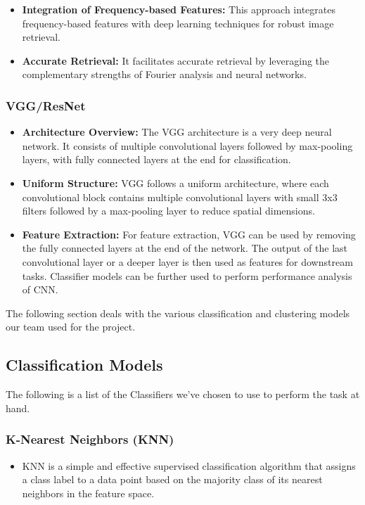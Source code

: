 \documentclass[a4paper]{article}
\theoremstyle{plain}
\theoremstyle{definition}
\begin{document}
{\begin{itemize}
    \item[] \textbf{Integration of Frequency-based Features:} This approach integrates frequency-based features with deep learning techniques for robust image retrieval.
    
    \item[] \textbf{Accurate Retrieval:} It facilitates accurate retrieval by leveraging the complementary strengths of Fourier analysis and neural networks.
\end{itemize}

\subsubsection {VGG/ResNet}
\begin{itemize}
     \item[] \textbf{Architecture Overview:} The VGG architecture is a very deep neural network. It consists of multiple convolutional layers followed by max-pooling layers, with fully connected layers at the end for classification.
    
    \item[] \textbf{Uniform Structure:} VGG follows a uniform architecture, where each convolutional block contains multiple convolutional layers with small 3x3 filters followed by a max-pooling layer to reduce spatial dimensions.
    
    \item[] \textbf{Feature Extraction:} For feature extraction, VGG can be used by removing the fully connected layers at the end of the network. The output of the last convolutional layer or a deeper layer is then used as features for downstream tasks. Classifier models can be further used to perform performance analysis of CNN. 

\end{itemize}

\noindent \newline The following section deals with the various classification and clustering models our team used for the project.
\newpage
\subsection {Classification Models}

The following is a list of the Classifiers we've chosen to use to perform the task at hand.

\subsubsection {K-Nearest Neighbors (KNN)}
\begin{itemize}
    \item[] KNN is a simple and effective supervised classification algorithm that assigns a class label to a data point based on the majority class of its nearest neighbors in the feature space. 
\end{itemize}
}
\end{document}

